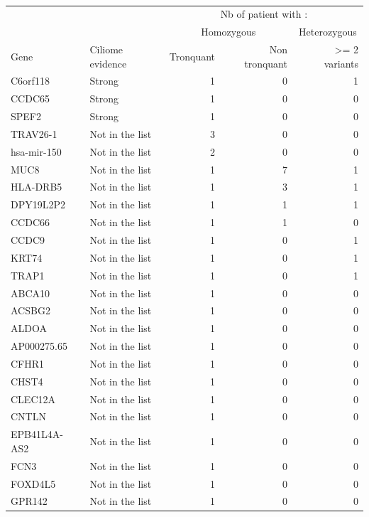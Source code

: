 \documentclass[12pt,twoside]{reedthesis}
\theoremstyle{definition}
\theoremstyle{definition}
\theoremstyle{remark}
\begin{document}
  \begin{longtable}[t]{llrrr}
  \caption{\label{tab:annexetabaftergrp2}}\\
  \toprule
  \multicolumn{1}{c}{ } & \multicolumn{1}{c}{ } & \multicolumn{3}{c}{Nb of patient with : } \\
  \cmidrule(l{2pt}r{2pt}){3-5}
  \multicolumn{1}{c}{ } & \multicolumn{1}{c}{ } & \multicolumn{2}{c}{Homozygous} & \multicolumn{1}{c}{Heterozygous} \\
  \cmidrule(l{2pt}r{2pt}){3-4} \cmidrule(l{2pt}r{2pt}){5-5}
  Gene & Ciliome evidence & Tronquant & Non tronquant & >= 2 variants\\
  \midrule
  C6orf118 & Strong & 1 & 0 & 1\\
  CCDC65 & Strong & 1 & 0 & 0\\
  SPEF2 & Strong & 1 & 0 & 0\\
  TRAV26-1 & Not in the list & 3 & 0 & 0\\
  hsa-mir-150 & Not in the list & 2 & 0 & 0\\
  \addlinespace
  MUC8 & Not in the list & 1 & 7 & 1\\
  HLA-DRB5 & Not in the list & 1 & 3 & 1\\
  DPY19L2P2 & Not in the list & 1 & 1 & 1\\
  CCDC66 & Not in the list & 1 & 1 & 0\\
  CCDC9 & Not in the list & 1 & 0 & 1\\
  \addlinespace
  KRT74 & Not in the list & 1 & 0 & 1\\
  TRAP1 & Not in the list & 1 & 0 & 1\\
  ABCA10 & Not in the list & 1 & 0 & 0\\
  ACSBG2 & Not in the list & 1 & 0 & 0\\
  ALDOA & Not in the list & 1 & 0 & 0\\
  \addlinespace
  AP000275.65 & Not in the list & 1 & 0 & 0\\
  CFHR1 & Not in the list & 1 & 0 & 0\\
  CHST4 & Not in the list & 1 & 0 & 0\\
  CLEC12A & Not in the list & 1 & 0 & 0\\
  CNTLN & Not in the list & 1 & 0 & 0\\
  \addlinespace
  EPB41L4A-AS2 & Not in the list & 1 & 0 & 0\\
  FCN3 & Not in the list & 1 & 0 & 0\\
  FOXD4L5 & Not in the list & 1 & 0 & 0\\
  GPR142 & Not in the list & 1 & 0 & 0\\

\end{longtable}
\end{document}
